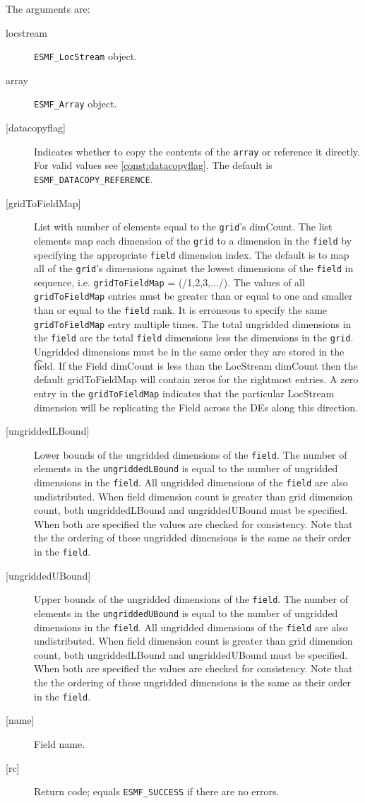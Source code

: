    The arguments are:
   \begin{description}
   \item [locstream]
   {\tt ESMF\_LocStream} object.
   \item [array]
   {\tt ESMF\_Array} object.
   \item [{[datacopyflag]}]
   Indicates whether to copy the contents of the {\tt array} or reference it directly.
   For valid values see \ref{const:datacopyflag}. The default is
   {\tt ESMF\_DATACOPY\_REFERENCE}.
   \item [{[gridToFieldMap]}]
   List with number of elements equal to the
   {\tt grid}'s dimCount. The list elements map each dimension
   of the {\tt grid} to a dimension in the {\tt field} by
   specifying the appropriate {\tt field} dimension index. The default is to
   map all of the {\tt grid}'s dimensions against the lowest dimensions of
   the {\tt field} in sequence, i.e. {\tt gridToFieldMap} = (/1,2,3,.../).
   The values of all {\tt gridToFieldMap} entries must be greater than or equal
   to one and smaller than or equal to the {\tt field} rank.
   It is erroneous to specify the same {\tt gridToFieldMap} entry
   multiple times. The total ungridded dimensions in the {\tt field}
   are the total {\tt field} dimensions less
   the dimensions in
   the {\tt grid}. Ungridded dimensions must be in the same order they are
   stored in the {\t field}.
   If the Field dimCount is less than the LocStream dimCount then the default
   gridToFieldMap will contain zeros for the rightmost entries. A zero
   entry in the {\tt gridToFieldMap} indicates that the particular
   LocStream dimension will be replicating the Field across the DEs along
   this direction.
   \item [{[ungriddedLBound]}]
   Lower bounds of the ungridded dimensions of the {\tt field}.
   The number of elements in the {\tt ungriddedLBound} is equal to the number of ungridded
   dimensions in the {\tt field}. All ungridded dimensions of the
   {\tt field} are also undistributed. When field dimension count is
   greater than grid dimension count, both ungriddedLBound and ungriddedUBound
   must be specified. When both are specified the values are checked
   for consistency. Note that the the ordering of
   these ungridded dimensions is the same as their order in the {\tt field}.
   \item [{[ungriddedUBound]}]
   Upper bounds of the ungridded dimensions of the {\tt field}.
   The number of elements in the {\tt ungriddedUBound} is equal to the number of ungridded
   dimensions in the {\tt field}. All ungridded dimensions of the
   {\tt field} are also undistributed. When field dimension count is
   greater than grid dimension count, both ungriddedLBound and ungriddedUBound
   must be specified. When both are specified the values are checked
   for consistency. Note that the the ordering of
   these ungridded dimensions is the same as their order in the {\tt field}.
   \item [{[name]}]
   Field name.
   \item [{[rc]}]
   Return code; equals {\tt ESMF\_SUCCESS} if there are no errors.
   \end{description} 
 
